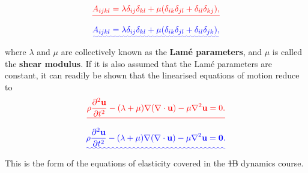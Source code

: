 \documentclass [a4paper,12pt]{paper}
\providecommand{\DIFadd}[1]{{\protect\color{blue}\uwave{#1}}} %
\providecommand{\DIFdel}[1]{{\protect\color{red}\sout{#1}}}                      %
\providecommand{\DIFaddbegin}{} %
\providecommand{\DIFaddend}{} %
\providecommand{\DIFdelbegin}{} %
\providecommand{\DIFdelend}{} %
\begin{document}
\DIFdelbegin \begin{displaymath}
\DIFdel{A_{ijkl} = \lambda\delta_{ij}\delta_{kl} + \mu(\delta_{ik}\delta_{jl} + \delta_{il}\delta_{kj}),
}\end{displaymath}%
\DIFdelend \DIFaddbegin \begin{equation}
\DIFadd{A_{ijkl} = \lambda\delta_{ij}\delta_{kl} + \mu(\delta_{ik}\delta_{jl} + \delta_{il}\delta_{jk}),
\label{eq:42}
}\end{equation}\DIFaddend 
where $\lambda$ and $\mu$ are collectively known as the \textbf{Lamé parameters}, and $\mu$ is 
called the \textbf{shear modulus}. If it is also assumed that the Lamé parameters are constant, it can readily be shown that
 the linearised equations of motion reduce to
\DIFdelbegin \begin{displaymath}
\DIFdel{\rho\frac{\partial^2 \mathbf{u}}{\partial t^2} - (\lambda + \mu)\nabla(\nabla\cdot \mathbf{u}) - \mu\nabla^2 \mathbf{u} = 0.
}\end{displaymath}%
\DIFdelend \DIFaddbegin \begin{equation}
\DIFadd{\rho\frac{\partial^2 \mathbf{u}}{\partial t^2} - (\lambda + \mu)\nabla(\nabla\cdot \mathbf{u}) - \mu\nabla^2 \mathbf{u} = \mathbf{0}.
\label{eq:43}
}\end{equation}\DIFaddend 
This is the form of the equations of elasticity covered in the \DIFdelbegin \DIFdel{1B }\DIFdelend \DIFaddbegin \DIFadd{Part IB }\DIFaddend dynamics course. 
\end{document}
